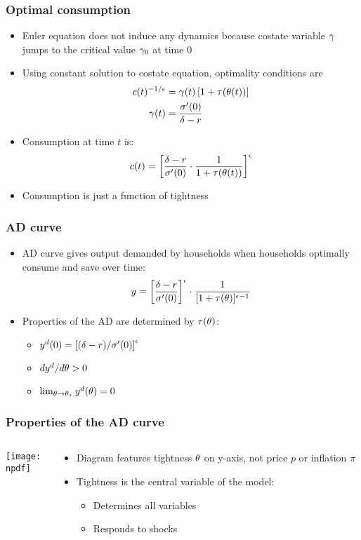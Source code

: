 \documentclass[11pt,aspectratio=169,xcolor={dvipsnames},hyperref={pdftex,pdfpagemode=UseNone,hidelinks,pdfdisplaydoctitle=true},usepdftitle=false]{beamer}
\newcommand{\npdf}{../figures/figures3.pdf}
\begin{document}
\begin{frame}
\frametitle{Optimal consumption}
\begin{itemize}
\item Euler equation does not induce any dynamics because costate variable $\gamma$ jumps to the critical value $\gamma_0$ at time $0$
\item Using constant solution to costate equation, optimality conditions are
\begin{align*}
c(t)^{-1/\epsilon} &= \gamma(t) \left[ 1+\tau(\theta(t)) \right]\\
\gamma(t) & =   \frac{\sigma'(0)}{\delta - r}
\end{align*}
\item Consumption at time $t$ is:
\begin{equation*}
c(t) = \left[ \frac{\delta - r}{\sigma'(0)}\cdot \frac{1}{1+\tau(\theta(t))} \right]^{\epsilon}
\end{equation*}
\item[\then] Consumption is just a function of tightness
\end{itemize}	
\end{frame}

\begin{frame}
\frametitle{AD curve}
\begin{itemize}
\item AD curve gives output demanded by households when households optimally consume and save over time:
\begin{equation*}
y = \left[ \frac{\delta - r}{\sigma'(0)} \right]^{\epsilon} \cdot \frac{1}{[1+\tau(\theta)]^{\epsilon-1}}
\end{equation*}
\item Properties of the AD are determined by $\tau(\theta)$:
\begin{itemize}
\item $y^d(0) = \left[ (\delta - r)/\sigma'(0) \right]^{\epsilon}$
\item $d y^d/d \theta>0$
\item $\lim_{\theta\to \theta_{\tau}} y^d(\theta) = 0$
\end{itemize}
\end{itemize}	
\end{frame}

\begin{frame}
\frametitle{Properties of the AD curve}
\begin{columns}
\begin{column}{0.6\textwidth}
\texttt{[image: \\npdf]}%
\end{column}
\begin{column}{0.4\textwidth}
\begin{itemize}
	\item Diagram features tightness $\theta$ on y-axis, not price $p$ or inflation $\pi$
	\item Tightness is the central variable of the model:
	\begin{itemize}
	\item Determines all variables
	\item Responds to shocks
	\end{itemize}
\end{itemize}
\end{column}  
\end{columns}
\end{frame}
\end{document}
